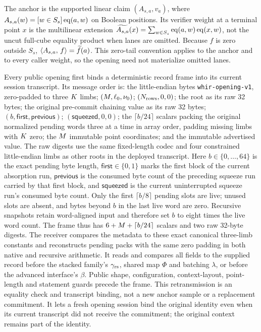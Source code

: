 \begin{protocol}
The anchor is the supported linear claim $(A_{s,a},v_a)$, where $A_{s,a}(w)=[w\in S_s]\operatorname{eq}(a,w)$ on Boolean positions. Its verifier weight at a terminal point $x$ is the multilinear extension $\widetilde{A_{s,a}}(x)=\sum_{w\in S_s}\operatorname{eq}(a,w)\operatorname{eq}(x,w)$, not the uncut full-cube equality product when lanes are omitted. Because $f$ is zero outside $S_s$, $\langle A_{s,a},\, f \rangle=\widetilde{f}(a)$. This zero-tail convention applies to the anchor and to every caller weight, so the opening need not materialize omitted lanes.

Every public opening first binds a deterministic record frame into its current session transcript. Its message order is: the little-endian bytes \texttt{whir-opening-v1}, zero-padded to three $K$ limbs; $(M,\ell_0,\nu_0)$; $(N_{\mathrm{rows}},0,0)$; the root as its raw 32 bytes; the original pre-commit chaining value as its raw 32 bytes; $(b,\mathsf{first},\mathsf{previous})$; $(\mathsf{squeezed},0,0)$; the $\lceil b/24\rceil$ scalars packing the original normalized pending words three at a time in array order, padding missing limbs with $K$ zero; the $M$ immutable point coordinates; and the immutable advertised value. The raw digests use the same fixed-length codec and four constrained little-endian limbs as other roots in the deployed transcript. Here $b\in\{0,\ldots,64\}$ is the exact pending byte length, $\mathsf{first}\in\{0,1\}$ marks the first block of the current absorption run, $\mathsf{previous}$ is the consumed byte count of the preceding squeeze run carried by that first block, and $\mathsf{squeezed}$ is the current uninterrupted squeeze run's consumed byte count. Only the first $\lceil b/8\rceil$ pending slots are live; unused slots are absent, and bytes beyond $b$ in the last live word are zero. Recursive snapshots retain word-aligned input and therefore set $b$ to eight times the live word count. The frame thus has $6+M+\lceil b/24\rceil$ scalars and two raw 32-byte digests. The receiver compares the metadata to these exact canonical three-limb constants and reconstructs pending packs with the same zero padding in both native and recursive arithmetic. It reads and compares all fields to the supplied record before the stacked family's $\gamma_{\mathrm{rs}}$, shared map $\Phi$ and batching $\lambda$, or before the advanced interface's $\beta$. Public shape, configuration, context-layout, point-length and statement guards precede the frame. This retransmission is an equality check and transcript binding, not a new anchor sample or a replacement commitment. It lets a fresh opening session bind the original identity even when its current transcript did not receive the commitment; the original context remains part of the identity.


\end{protocol}
